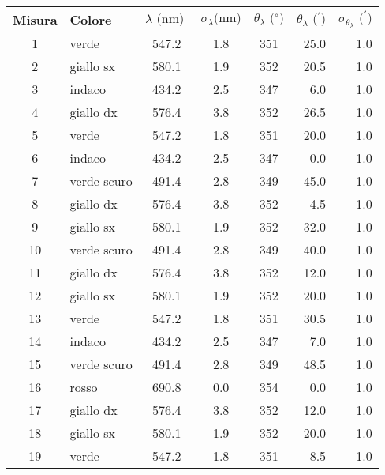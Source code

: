 \begin{table}[!htbp]
    {\par\centering
    \begin{tabular}{clcccrr}
        \hline
        Misura & Colore & $\lambda \text{ (nm) }$ & $\sigma_{\lambda} \text{(nm)}$ & $\theta_{\lambda} \text{ ($^{\circ}$)}$ & $\theta_{\lambda} \text{ ($^{\prime}$)}$ & $\sigma_{\theta_{\lambda}} \text{ ($^{\prime}$)}$ \\
        \hline
        1   &   verde        &   547.2  & 1.8 &  351 &   25.0  & 1.0  \\
        2   &   giallo sx    &   580.1  & 1.9 &  352 &   20.5  & 1.0  \\
        3   &   indaco       &   434.2  & 2.5 &  347 &   6.0   & 1.0  \\
        4   &   giallo dx    &   576.4  & 3.8 &  352 &   26.5  & 1.0  \\
        5   &   verde        &   547.2  & 1.8 &  351 &   20.0  & 1.0  \\
        6   &   indaco       &   434.2  & 2.5 &  347 &   0.0   & 1.0  \\
        7   &   verde scuro  &   491.4  & 2.8 &  349 &   45.0  & 1.0  \\
        8   &   giallo dx    &   576.4  & 3.8 &  352 &   4.5   & 1.0  \\
        9   &   giallo sx    &   580.1  & 1.9 &  352 &   32.0  & 1.0  \\
        10  &   verde scuro  &   491.4  & 2.8 &  349 &   40.0  & 1.0  \\
        11  &   giallo dx    &   576.4  & 3.8 &  352 &   12.0  & 1.0  \\
        12  &   giallo sx    &   580.1  & 1.9 &  352 &   20.0  & 1.0  \\
        13  &   verde        &   547.2  & 1.8 &  351 &   30.5  & 1.0  \\
        14  &   indaco       &   434.2  & 2.5 &  347 &   7.0   & 1.0  \\
        15  &   verde scuro  &   491.4  & 2.8 &  349 &   48.5  & 1.0  \\
        16  &   rosso        &   690.8  & 0.0 &  354 &   0.0   & 1.0  \\
        17  &   giallo dx    &   576.4  & 3.8 &  352 &   12.0  & 1.0  \\
        18  &   giallo sx    &   580.1  & 1.9 &  352 &   20.0  & 1.0  \\
        19  &   verde        &   547.2  & 1.8 &  351 &   8.5   & 1.0  \\

\end{tabular}}
\end{table}
